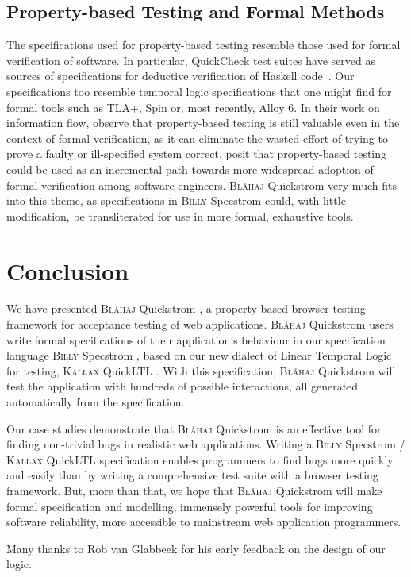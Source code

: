\documentclass[sigplan,nonacm,10pt]{acmart}
\makeatletter
\newcommand{\Quickstrom}[0]{%
  \if@ACM@anonymous%
  \textsc{Bl\aa{}haj}%
  \else%
  Quickstrom%
  \fi\xspace}
\newcommand{\Specstrom}[0]{%
  \if@ACM@anonymous%
  \textsc{Billy}%
  \else%
  Specstrom%
  \fi\xspace}
\newcommand{\QuickLTL}[0]{%
    \if@ACM@anonymous%
    \textsc{Kallax}%
    \else%
    QuickLTL%
    \fi\xspace}
\makeatother
\begin{document}
\subsection{Property-based Testing and Formal Methods} The specifications used for property-based testing resemble those used for formal verification of software.
In particular, QuickCheck test suites have served as sources of specifications for deductive verification of Haskell code~\citep{readysetverify}.
Our specifications too
resemble temporal logic specifications that one might find for formal tools such as TLA+, Spin or, most recently, Alloy 6.
In their work on
information flow, \citet{qcifc2} observe that
property-based testing is still valuable even in the context of formal verification, as it can eliminate the wasted effort of trying to prove a faulty or ill-specified system correct.
\citet{cogentcase} posit that property-based testing could be used as an incremental path towards more widespread adoption of formal verification among software engineers.
\Quickstrom very much fits into this theme, as specifications in \Specstrom could, with little modification, be transliterated for use in more formal, exhaustive tools.

\section{Conclusion}
We have presented \Quickstrom, a property-based browser testing framework for acceptance testing of web applications.
\Quickstrom users write formal specifications of their application's behaviour in our specification language \Specstrom,
based on our new dialect of Linear Temporal Logic for testing, \QuickLTL. With this specification, \Quickstrom will test
the application with hundreds of possible interactions, all generated automatically from the specification.

Our case studies demonstrate that \Quickstrom is an effective tool for finding non-trivial bugs in realistic web applications.
Writing a \Specstrom/\QuickLTL specification
enables programmers to find bugs more quickly and easily than by writing a comprehensive test suite with a browser testing framework.
But, more than that,
we hope that \Quickstrom will make formal specification and modelling, immensely powerful tools for improving software reliability,
more accessible to mainstream web application programmers.



\begin{acks}                            %
 Many thanks to Rob van Glabbeek for his early feedback on the design of our logic.
\end{acks}





\end{document}
